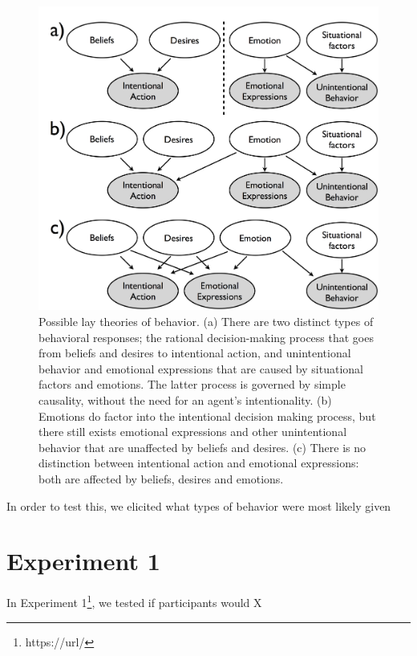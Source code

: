 \documentclass[10pt,letterpaper]{article}
\begin{document}
\begin{figure}[htb!]
\begin{center}
\includegraphics[width=1\columnwidth]{images/model1.png} 
\end{center}
\caption{ Possible lay theories of behavior. (a) There are two distinct types of behavioral responses; the rational decision-making process that goes from beliefs and desires to intentional action, and unintentional behavior and emotional expressions that are caused by situational factors and emotions. The latter process is governed by simple causality, without the need for an agent's intentionality. (b) Emotions do factor into the intentional decision making process, but there still exists emotional expressions and other unintentional behavior that are unaffected by beliefs and desires. (c) There is no distinction between intentional action and emotional expressions: both are affected by beliefs, desires and emotions.  }
\label{ModelsOfBehaviorFig}
\end{figure}


In order to test this, we elicited what types of behavior were most likely given 




\section{Experiment 1}

	In Experiment 1\footnote{https://url/}, we tested if participants would X
\end{document}
